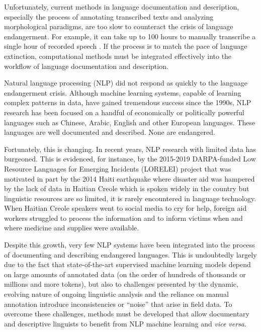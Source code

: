 Unfortunately, current methods in language documentation and description, especially the process of annotating transcribed texts and analyzing morphological paradigms, are too slow to counteract the crisis of language endangerment. For example, it can take up to 100 hours to manually transcribe a single hour of recorded speech \citep{seifart_language_2018}.
If the process is to match the pace of language extinction, computational methods must be integrated effectively into the workflow of language documentation and description. 

Natural language processing (NLP) did not respond as quickly to the language endangerment crisis. Although machine learning systems, capable of learning complex patterns in data, have gained tremendous success since the 1990s, NLP research has been focused on a handful of economically or politically powerful languages such as Chinese, Arabic, English and other European languages. These languages are well documented and described. None 
are endangered.

Fortunately, this is changing. In recent years, NLP research with limited data has burgeoned. This is evidenced, for instance, by the 2015-2019 DARPA-funded Low Resource Languages for Emerging Incidents (LORELEI) project that was motivated in part by the 2014 Haiti earthquake where disaster aid was hampered by the lack of data in Haitian Creole which is spoken widely in the country but linguistic resources are so limited, it is rarely encountered in language technology. When Haitian Creole speakers went to social media to cry for help, foreign aid workers struggled to process the information and to inform victims when and where medicine and supplies were available.

Despite this growth, very few NLP systems have been integrated into the process of documenting and describing endangered languages. This is undoubtedly largely due to the fact that state-of-the-art supervised machine learning models depend on large amounts of annotated data (on the order of hundreds of thousands or millions and more tokens), but also to challenges presented by the dynamic, evolving nature of ongoing linguistic analysis and the reliance on manual annotation introduce inconsistencies or ``noise'' that arise in field data. To overcome these challenges, methods must be developed that allow documentary and descriptive linguists to benefit from NLP machine learning and \textit{vice versa}.

